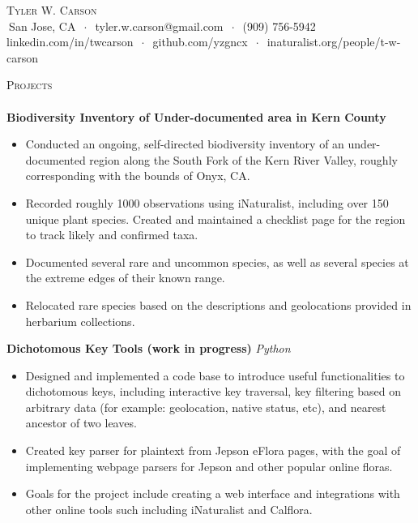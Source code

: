 \documentclass[]{article}
\newcommand{\lineunder} {
	\vspace*{-8pt} \\
	\hspace*{-18pt} \hrulefill \\
}
\newcommand{\header} [1] {
	{\hspace*{-18pt}\vspace*{6pt} \textsc{#1}}
	\vspace*{-6pt} \lineunder
}
\begin{document}
	\vspace*{-40pt}
	
	
	\vspace*{-10pt}
	\begin{center}
		{\Huge \scshape {Tyler W. Carson}}\\
		$\ $San Jose, CA $\ \cdot\ $ tyler.w.carson@gmail.com $\ \cdot\ $ (909) 756-5942\\ linkedin.com/in/twcarson $\ \cdot\ $ github.com/yzgncx $\ \cdot\ $ inaturalist.org/people/t-w-carson\\
	\end{center}
	

	\header{Projects}

	{\textbf{Biodiversity Inventory of Under-documented area in Kern County}} \hspace*{5mm} \\
	\vspace*{-5pt}\begin{itemize}	\itemsep 0pt
		\item Conducted an ongoing, self-directed biodiversity inventory of an under-documented region along the South Fork of the Kern River Valley, roughly corresponding with the bounds of Onyx, CA.
		\item Recorded roughly 1000 observations using iNaturalist, including over 150 unique plant species.  Created and maintained a checklist page for the region to track likely and confirmed taxa.
		\item Documented several rare and uncommon species, as well as several species at the extreme edges of their known range.
		\item Relocated rare species based on the descriptions and geolocations provided in herbarium collections.
	\end{itemize}
	\vspace*{0mm}
	
	{\textbf{Dichotomous Key Tools (work in progress)}} \hfill {\sl Python} \\
	\vspace*{-5pt}\begin{itemize}	\itemsep 0pt
		\item Designed and implemented a code base to introduce useful functionalities to dichotomous keys, including interactive key traversal, key filtering based on arbitrary data (for example: geolocation, native status, etc), and nearest ancestor of two leaves. 
		\item Created key parser for plaintext from Jepson eFlora pages, with the goal of implementing webpage parsers for Jepson and other popular online floras.
		\item Goals for the project include creating a web interface and integrations with other online tools such including iNaturalist and Calflora.
	\end{itemize}
	\vspace*{0mm}
	
\end{document}
